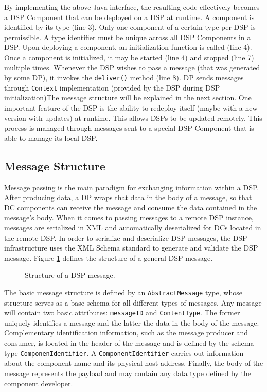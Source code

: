 \documentclass[conference]{IEEEtran}
\begin{document}
By implementing the above Java interface, the resulting code
effectively becomes a DSP Component that can be deployed on a DSP at
runtime. A component is identified by its type (line 3). Only one
component of a certain type per DSP is permissible. A type identifier
must be unique across all DSP Components in a DSP.  Upon deploying a
component, an initialization function is called (line 4). Once a
component is initialized, it may be started (line 4) and stopped (line
7) multiple times. Whenever the DSP wishes to pass a message (that was
generated by some DP), it invokes the \texttt{deliver()} method (line
8). DP sends messages through \texttt{Context} implementation (provided 
by the DSP during DSP initialization)The message structure will be explained in the next section.
One important feature of the DSP is the ability to redeploy itself (maybe
with a new version with updates) at runtime. This allows DSPs to be updated
remotely. This process is managed through messages sent to a special
DSP Component that is able to manage its local DSP.

\subsection{Message Structure}

Message passing is the main paradigm for exchanging information within
a DSP. After producing data, a DP wraps that data in the body
of a message, so that DC components can receive the message and
consume the data contained in the message's body. When it comes to passing
messages to a remote DSP instance, messages are serialized in XML
\cite{xml2000} and automatically deserialized for DCs located in the
remote DSP. In order to serialize and deserialize DSP messages, the
DSP infrastructure uses the XML Schema standard \cite{xml-schema2004}
to generate and validate the DSP message. Figure \ref{FIG_DSP_MESSAGE}
defines the structure of a general DSP message.

\begin{figure}[!htb]
 \centering
 \caption{\label{FIG_DSP_MESSAGE} Structure of a DSP message.}
\end{figure}

The basic message structure is defined by an \texttt{AbstractMessage}
type, whose structure serves as a base schema for all different types
of messages. Any message will contain two basic attributes:
\texttt{messageID} and \texttt{ContentType}.  The former uniquely
identifies a message and the latter the data in the body of the
message. Complementary identification information, such as the message
producer and consumer, is located in the header of the message and 
is defined by the schema type \texttt{ComponenIdentifier}. A
\texttt{ComponentIdentifier} carries out information about the
component name and its physical host address.  Finally, the body of
the message represents the payload and may contain any data type
defined by the component developer.
\end{document}
